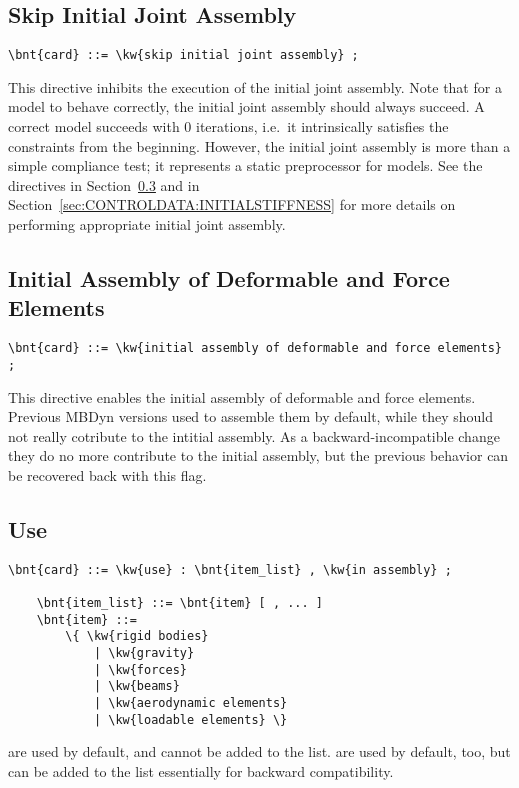 \subsection{Skip Initial Joint Assembly}
\begin{Verbatim}[commandchars=\\\{\}]
    \bnt{card} ::= \kw{skip initial joint assembly} ;
\end{Verbatim}
This directive inhibits the execution of the initial joint assembly.
Note that for a model to behave correctly, the initial joint assembly
should always succeed.
A correct model succeeds with 0 iterations, i.e.\ it intrinsically 
satisfies the constraints from the beginning.
However, the initial joint assembly is more than a simple compliance
test; it represents a static preprocessor for models.
See the directives  in Section~\ref{sec:CONTROLDATA:USE}
and  in Section~\ref{sec:CONTROLDATA:INITIALSTIFFNESS}
for more details on performing appropriate initial joint assembly.

\subsection{Initial Assembly of Deformable and Force Elements}
\begin{Verbatim}[commandchars=\\\{\}]
    \bnt{card} ::= \kw{initial assembly of deformable and force elements} ;
\end{Verbatim}
This directive enables the initial assembly of deformable and force elements.
Previous MBDyn versions used to assemble them by default, while they should not 
really cotribute to the intitial assembly.
As a backward-incompatible change they do no more contribute to the initial assembly,
but the previous behavior can be recovered back with this flag.


\subsection{Use}\label{sec:CONTROLDATA:USE}
\begin{Verbatim}[commandchars=\\\{\}]
    \bnt{card} ::= \kw{use} : \bnt{item_list} , \kw{in assembly} ;

    \bnt{item_list} ::= \bnt{item} [ , ... ]
    \bnt{item} ::=
        \{ \kw{rigid bodies}
            | \kw{gravity}
            | \kw{forces}
            | \kw{beams}
            | \kw{aerodynamic elements}
            | \kw{loadable elements} \} 
\end{Verbatim}
 are used by default, and cannot be added to the list.
 are used by default, too, but can be added to the list
essentially for backward compatibility.

